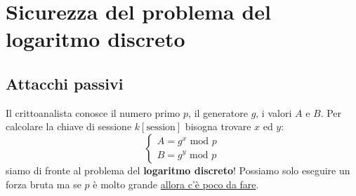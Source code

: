 \section{Sicurezza del problema del logaritmo discreto}
\subsection{Attacchi passivi}
Il crittoanalista conosce il numero primo $p$, il generatore $g$, i valori $A$ e $B$.
Per calcolare la chiave di sessione $k[\text{session}]$ bisogna trovare $x$ ed $y$:
\[
    \begin{cases}
    A = g^x \text{ mod } p \\
    B = g^y \text{ mod } p
    \end{cases}
\]
siamo di fronte al problema del \textbf{logaritmo discreto}! Possiamo solo eseguire un forza bruta ma se $p$ è molto grande {\underline{allora c'è poco da fare}}.


